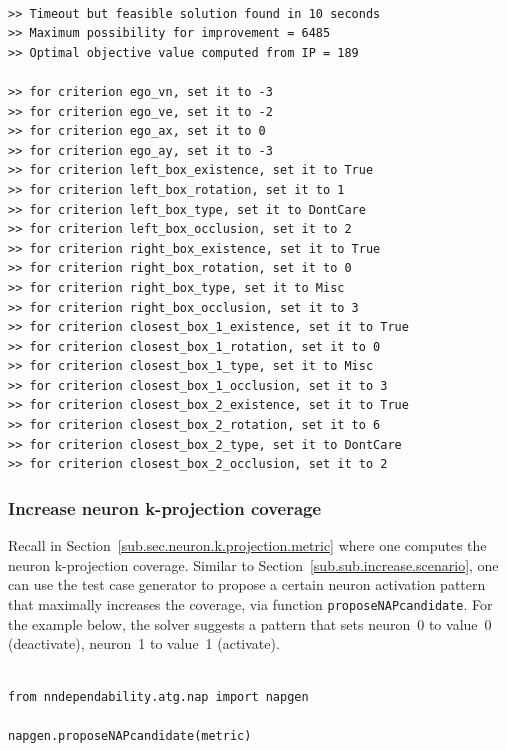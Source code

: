 \documentclass{article}
\begin{document}
\begin{small}
\color{red}
\begin{verbatim}

>> Timeout but feasible solution found in 10 seconds
>> Maximum possibility for improvement = 6485
>> Optimal objective value computed from IP = 189

>> for criterion ego_vn, set it to -3
>> for criterion ego_ve, set it to -2
>> for criterion ego_ax, set it to 0
>> for criterion ego_ay, set it to -3
>> for criterion left_box_existence, set it to True
>> for criterion left_box_rotation, set it to 1
>> for criterion left_box_type, set it to DontCare
>> for criterion left_box_occlusion, set it to 2
>> for criterion right_box_existence, set it to True
>> for criterion right_box_rotation, set it to 0
>> for criterion right_box_type, set it to Misc
>> for criterion right_box_occlusion, set it to 3
>> for criterion closest_box_1_existence, set it to True
>> for criterion closest_box_1_rotation, set it to 0
>> for criterion closest_box_1_type, set it to Misc
>> for criterion closest_box_1_occlusion, set it to 3
>> for criterion closest_box_2_existence, set it to True
>> for criterion closest_box_2_rotation, set it to 6
>> for criterion closest_box_2_type, set it to DontCare
>> for criterion closest_box_2_occlusion, set it to 2
\end{verbatim}
\end{small}

\subsubsection{Increase neuron k-projection coverage}

Recall in Section~\ref{sub.sec.neuron.k.projection.metric} where one computes the neuron k-projection coverage. Similar to Section~\ref{sub.sub.increase.scenario}, one can use the test case generator to propose a certain neuron activation pattern that maximally increases the coverage, via function \texttt{proposeNAPcandidate}. For the example below, the solver suggests a pattern that sets neuron~0 to value~0 (deactivate), neuron~1 to value~1 (activate). 

\begin{small}
\color{blue}
\begin{verbatim}

from nndependability.atg.nap import napgen

napgen.proposeNAPcandidate(metric)
\end{verbatim}
\end{small}
\end{document}
